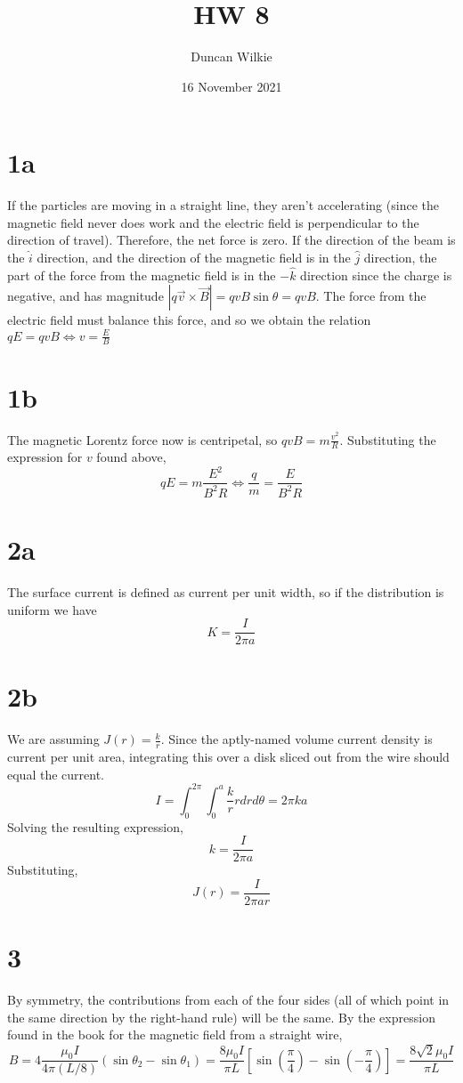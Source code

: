\documentclass{article}
\title{HW 8}
\date{16 November 2021}
\author{Duncan Wilkie}
\begin{document}
\maketitle

\section*{1a}
If the particles are moving in a straight line, they aren't accelerating (since the magnetic field never does work and the electric field is perpendicular to the direction of travel). Therefore, the net force is zero. If the direction of the beam is the $\hat{i}$ direction, and the direction of the magnetic field is in the $\hat{j}$ direction, the part of the force from the magnetic field is in the $-\hat{k}$ direction since the charge is negative, and has magnitude $|q\vec{v}\times\vec{B}|=qvB\sin\theta=qvB$. The force from the electric field must balance this force, and so we obtain the relation $qE=qvB\Leftrightarrow v=\frac{E}{B}$

\section*{1b}
The magnetic Lorentz force now is centripetal, so $qvB=m\frac{v^2}{R}$. Substituting the expression for $v$ found above,
\[qE=m\frac{E^2}{B^2R}\Leftrightarrow \frac{q}{m}=\frac{E}{B^2R}\]

\section*{2a}
The surface current is defined as current per unit width, so if the distribution is uniform we have
\[K=\frac{I}{2\pi a}\]

\section*{2b}
We are assuming $J(r)=\frac{k}{r}$. Since the aptly-named volume current density is current per unit area, integrating this over a disk sliced out from the wire should equal the current.
\[I=\int_0^{2\pi}\int_0^a\frac{k}{r}rdrd\theta=2\pi ka\]
Solving the resulting expression,
\[k=\frac{I}{2\pi a}\]
Substituting,
\[J(r)=\frac{I}{2\pi a r}\]

\section*{3}
By symmetry, the contributions from each of the four sides (all of which point in the same direction by the right-hand rule) will be the same. By the expression found in the book for the magnetic field from a straight wire,
\[B=4\frac{\mu_0 I}{4\pi(L/8)}\left( \sin\theta_2-\sin\theta_1 \right)=\frac{8\mu_0 I}{\pi L}\left[\sin\left(\frac{\pi}{4}\right)-\sin\left(-\frac{\pi}{4}\right)\right]=\frac{8\sqrt{2}\mu_0 I}{\pi L}\]
\end{document}
